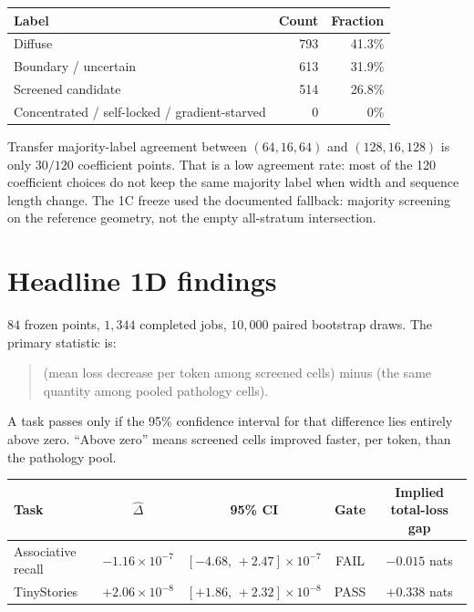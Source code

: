 \documentclass[11pt,a4paper]{report}
\begin{document}
\begin{center}
\begin{tabular}{lrr}
\toprule
Label & Count & Fraction \\
\midrule
Diffuse & 793 & 41.3\% \\
Boundary / uncertain & 613 & 31.9\% \\
Screened candidate & 514 & 26.8\% \\
Concentrated / self-locked / gradient-starved & 0 & $0\%$ \\
\bottomrule
\end{tabular}
\end{center}

Transfer majority-label agreement between $(64,16,64)$ and $(128,16,128)$ is only $30/120$ coefficient points. That is a low agreement rate: most of the 120 coefficient choices do not keep the same majority label when width and sequence length change. The 1C freeze used the documented fallback: majority screening on the reference geometry, not the empty all-stratum intersection.

\section{Headline 1D findings}

$84$ frozen points, $1{,}344$ completed jobs, $10{,}000$ paired bootstrap draws. The primary statistic is:

\begin{quote}
(mean loss decrease per token among screened cells) minus (the same quantity among pooled pathology cells).
\end{quote}

A task passes only if the 95\% confidence interval for that difference lies entirely above zero. ``Above zero'' means screened cells improved faster, per token, than the pathology pool.

\begin{center}
{\small
\begin{tabular}{lcccc}
\toprule
Task & $\widehat\Delta$ & 95\% CI & Gate & Implied total-loss gap \\
\midrule
Associative recall & $-1.16\times 10^{-7}$ & $[-4.68,\,+2.47]\times 10^{-7}$ & FAIL & $-0.015$ nats \\
TinyStories & $+2.06\times 10^{-8}$ & $[+1.86,\,+2.32]\times 10^{-8}$ & PASS & $+0.338$ nats \\
\bottomrule
\end{tabular}}
\end{center}
\end{document}
